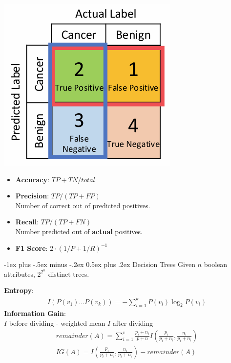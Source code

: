 \documentclass[10pt, landscape]{article}
\makeatletter
\renewcommand{\section}{\@startsection{section}{1}{0mm}%
                                {-1ex plus -.5ex minus -.2ex}%
                                {0.5ex plus .2ex}%
                                {\normalfont\large\bfseries}}
\makeatother
\begin{document}
\begin{multicols}{4}
\begin{center}
\includegraphics[width=0.6\linewidth]{cs2109s/images/confusion-matrix.png}
\end{center}


\begin{itemize}
    \item \textbf{Accuracy}: ${TP+TN}/total$
    \item \textcolor{myred}{\textbf{Precision}: $TP / (TP + FP)$
    \\ Number of correct out of predicted positives.}
    
    \item \textcolor{myblue}{\textbf{Recall}: $TP / (TP+FN)$
    \\ Number predicted out of \textbf{actual} positives.}
   
    \item \textbf{F1 Score}: $2 \cdot (1/P + 1/R)^{-1}$
\end{itemize}

\section{Decision Trees}
Given $n$ boolean attributes, $2^{2^n}$ distinct trees.

\begin{center}
\textbf{Entropy}:
\begin{align*}
    I(P(v_1) \dots P(v_k)) = -\sum^k_{i=1} P(v_i) \log_2P(v_i)
\end{align*} 
\textbf{Information Gain}: \\
$I$ before dividing - weighted mean $I$ after dividing
\begin{align*}
    remainder(A) = \sum^v_{i=1} \frac{p_i+n_i}{p+n}I\left( \frac{p_i}{p_i+n_i}, \frac{n_i}{p_i+n_i}\right)\\
    IG(A) = I\left( \frac{p_i}{p_i+n_i}, \frac{n_i}{p_i+n_i}\right) - remainder(A)
\end{align*}


\end{center}
\end{multicols}
\end{document}
